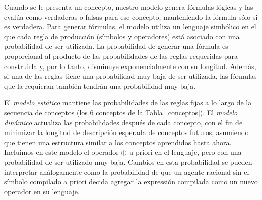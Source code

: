 Cuando se le presenta un concepto, nuestro modelo genera fórmulas lógicas y las evalúa como verdaderas o falsas para ese concepto, manteniendo la fórmula sólo si es verdadera. Para generar fórmulas, el modelo utiliza un lenguaje simbólico en el que cada regla de producción (símbolos y operadores) está asociado con una probabilidad de ser utilizada. La probabilidad de generar una fórmula es proporcional al producto de las probabilidades de las reglas requeridas para construirla y, por lo tanto, disminuye exponencialmente con su longitud. Además, si una de las reglas tiene una probabilidad muy baja de ser utilizada, las fórmulas que la requieran también tendrán una probabilidad muy baja.



El \textit{modelo estático} mantiene las probabilidades de las reglas fijas a lo largo de la secuencia de conceptos (los 6 conceptos de la Tabla~\ref{conceptos}). El \textit{modelo dinámico} actualiza las probabilidades después de cada concepto, con el fin de minimizar la longitud de descripción esperada de conceptos futuros, asumiendo que tienen una estructura similar a los conceptos aprendidos hasta ahora. Incluimos en este modelo el operador $\oplus$ a priori en el lenguaje, pero con una probabilidad de ser utilizado muy baja. Cambios en esta probabilidad se pueden interpretar análogamente como la probabilidad de que un agente racional sin el símbolo compilado a priori decida agregar la expressión compilada como un nuevo operador en su lenguaje.


